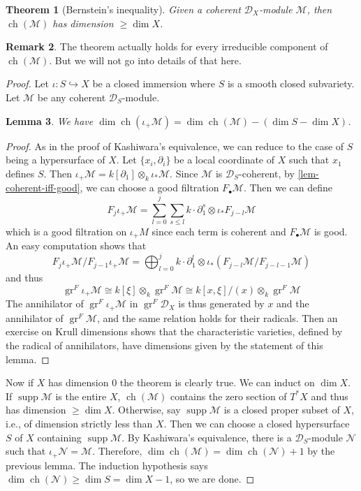 \documentclass[11pt, a4paper]{article}
\newtheorem{theorem}{Theorem}[subsection]
\newtheorem{lemma}[theorem]{Lemma}
\theoremstyle{definition}
\newtheorem{remark}[theorem]{Remark}
\newcommand{\gr}{\operatorname{gr}}
\newcommand{\ch}{\operatorname{ch}}
\newcommand{\supp}{\operatorname{supp}}
\begin{document}
    \begin{theorem}[Bernstein's inequality]
        Given a coherent $\mathcal D_X$-module $\mathcal M$, then $\ch(\mathcal M)$ has dimension $\geqslant \dim X$.
        \label{thm-bernstein-ineq}
    \end{theorem}
    \begin{remark}
        The theorem actually holds for every irreducible component of $\ch(\mathcal M)$. But we will not go into details of that here.
    \end{remark}
    \begin{proof}
        Let $\iota:S\hookrightarrow X$ be a closed immersion where $S$ is a smooth closed subvariety. Let $\mathcal M$ be any coherent $\mathcal D_S$-module.
        \begin{lemma}
            We have $\dim\ch(\iota_+\mathcal M)=\dim\ch(\mathcal M)-(\dim S-\dim X)$.
        \end{lemma}
        \begin{proof}
            As in the proof of Kashiwara's equivalence, we can reduce to the case of $S$ being a hypersurface of $X$. Let $\{x_i,\partial_i\}$ be a local coordinate of $X$ such that $x_1$ defines $S$. Then $\iota_+\mathcal M=k[\partial_1]\otimes_k\iota_*\mathcal M$. Since $\mathcal M$ is $\mathcal D_S$-coherent, by \cref{lem-coherent-iff-good}, we can choose a good filtration $F_\bullet\mathcal M$. Then we can define
            \[F_j\iota_+\mathcal M=\sum_{l=0}^j\sum_{s\leqslant l}k\cdot\partial_1^s\otimes\iota_*F_{j-l}\mathcal M\]
            which is a good filtration on $\iota_+M$ since each term is coherent and $F_\bullet\mathcal M$ is good. An easy computation shows that
            \[F_j\iota_+\mathcal M/F_{j-1}\iota_+\mathcal M=\bigoplus_{l=0}^jk\cdot \partial_1^l\otimes\iota_*(F_{j-l}\mathcal M/F_{j-l-1}\mathcal M)\]
            and thus
            \[\gr^F\iota_+\mathcal M\cong k[\xi]\otimes_k\gr^F\mathcal M\cong k[x, \xi]/(x)\otimes_k\gr^F\mathcal M\]
            The annihilator of $\gr^F\iota_+\mathcal M$ in $\gr^F\mathcal D_X$ is thus generated by $x$ and the annihilator of $\gr^F\mathcal M$, and the same relation holds for their radicals. Then an exercise on Krull dimensions shows that the characteristic varieties, defined by the radical of annihilators, have dimensions given by the statement of this lemma.
        \end{proof}
        Now if $X$ has dimension $0$ the theorem is clearly true. We can induct on $\dim X$. If $\supp \mathcal M$ is the entire $X$, $\ch(\mathcal M)$ contains the zero section of $T^*X$ and thus has dimension $\geqslant \dim X$. Otherwise, say $\supp\mathcal M$ is a closed proper subset of $X$, i.e., of dimension strictly less than $X$. Then we can choose a closed hypersurface $S$ of $X$ containing $\supp\mathcal M$. By Kashiwara's equivalence, there is a $\mathcal D_S$-module $\mathcal N$ such that $\iota_+\mathcal N=\mathcal M$. Therefore, $\dim\ch(\mathcal M)=\dim\ch(\mathcal N)+1$ by the previous lemma. The induction hypothesis says $\dim\ch(\mathcal N)\geqslant \dim S=\dim X-1$, so we are done.
    \end{proof}
\end{document}
